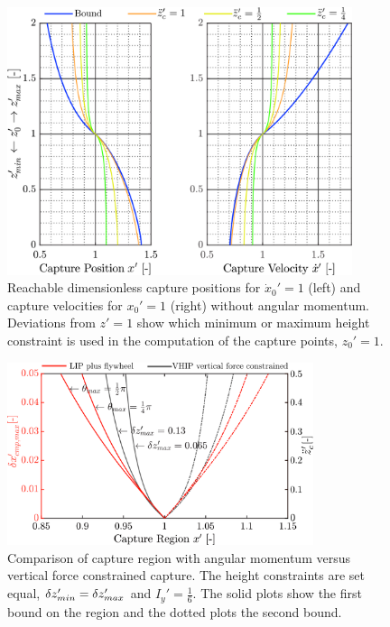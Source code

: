 \begin{figure}
      \centering
      \includegraphics[width=0.9\textwidth]{STYLESTUFF/caplimits2.png}
      \caption{Reachable dimensionless capture positions for $\dot{x}_0'=1$ (left) and capture velocities for $x_0' = 1$ (right) without angular momentum. Deviations from $z'=1$ show which minimum or maximum height constraint is used in the computation of the capture points, $z_0'=1$.}
      \label{fig:caplimits}
\end{figure}
\begin{figure}
\centering
\includegraphics[width=0.8\textwidth]{STYLESTUFF/capcompare.png}
\caption{Comparison of capture region with angular momentum versus vertical force constrained capture. The height constraints are set equal, $\delta z_{min}' =\delta z_{max}'$ and $I_y' = \frac{1}{6}$. The solid plots show the first bound on the region and the dotted plots the second bound.}
\label{fig:capcompare}
\end{figure}

